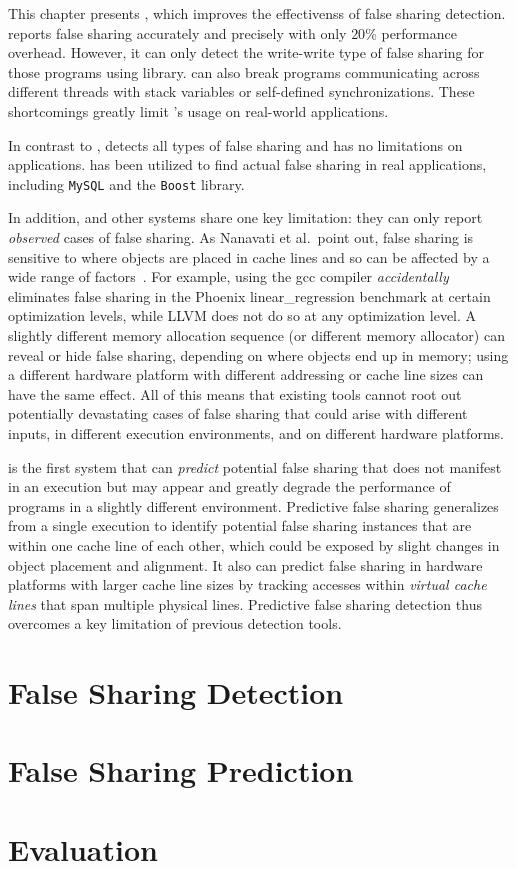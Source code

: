 \label{chapter:preditor}

This chapter presents \Predator{}, which improves the effectivenss of false sharing detection. \SheriffDetect{} reports false sharing accurately and precisely with only $20\%$ performance overhead. However, it can only detect the write-write type of false sharing for those programs using \pthreads{} library. \SheriffDetect{} can also break programs communicating across different threads with stack variables or self-defined synchronizations. These shortcomings greatly limit \SheriffDetect{}'s usage on real-world applications.  

In contrast to \SheriffDetect{}, \Predator{} detects all types of false sharing and has no limitations on applications. \Predator{} has been utilized to find actual false sharing in real applications, including \texttt{MySQL} and the \texttt{Boost} library.

In addition, \SheriffDetect{} and other systems share one key limitation: they can only report \emph{observed} cases of false sharing. As Nanavati et al.\ point out, false sharing is sensitive to where objects are placed in cache lines and so can be affected by a wide range of factors~\cite{OSdetection}. For example, using the gcc compiler \emph{accidentally} eliminates false sharing in the Phoenix linear\_regression benchmark at certain optimization levels, while LLVM does not do so at any optimization level.  A slightly different memory allocation sequence (or different memory allocator) can reveal or hide false sharing, depending on where objects end up in memory; using a different hardware platform with different addressing or cache line sizes can have the same effect. All of this means that existing tools cannot root out potentially devastating cases of false sharing that could arise with different inputs, in different execution environments, and on different hardware platforms.

\Predator{} is the first system that can \emph{predict} potential false sharing that does not manifest in an execution but may appear and greatly degrade the performance of programs in a slightly different
environment. Predictive false sharing generalizes from a single execution to identify potential false sharing instances that are within one cache line of each other, which could be exposed by slight changes in object placement and alignment. It also can predict false sharing in hardware platforms with larger cache line sizes by tracking accesses within \emph{virtual cache lines} that span multiple physical lines. Predictive false sharing detection thus overcomes a key limitation of previous detection tools.

\section{False Sharing Detection}


\section{False Sharing Prediction}


\section{Evaluation}



